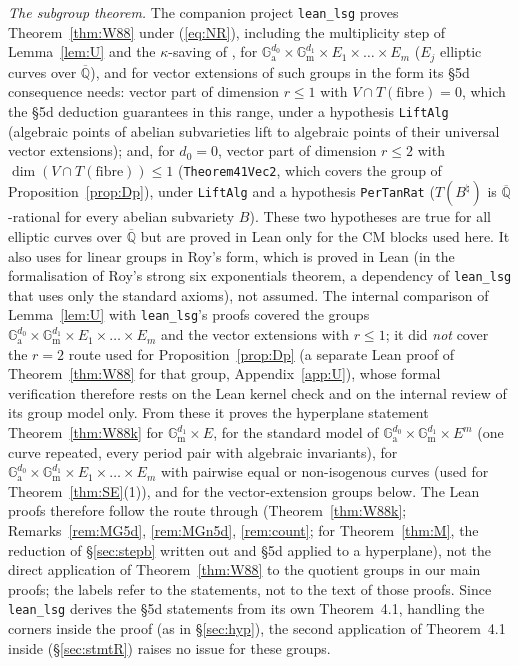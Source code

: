 \documentclass[11pt]{amsart}
\theoremstyle{definition}
\newcommand{\Qb}{\overline{\mathbb{Q}}}
\newcommand{\Ga}{\mathbb{G}_{\mathrm a}}
\newcommand{\Gm}{\mathbb{G}_{\mathrm m}}
\begin{document}
\emph{The subgroup theorem.} The companion project \texttt{lean\_lsg} \cite{LSG} proves Theorem~\ref{thm:W88} under (\ref{eq:NR}),
including the multiplicity step of Lemma~\ref{lem:U} and the $\kappa$-saving of \cite[Prop.~2.1]{W83}, for
$\Ga^{d_0}\times\Gm^{d_1}\times E_1\times\dots\times E_m$ ($E_j$ elliptic curves over $\Qb$), and for vector extensions of
such groups in the form its \S5d consequence needs: vector part of dimension $r\le1$ with $V\cap T(\text{fibre})=0$, which
the \S5d deduction guarantees in this range, under a hypothesis \texttt{LiftAlg} (algebraic points of abelian subvarieties
lift to algebraic points of their universal vector extensions); and, for $d_0=0$, vector part of dimension $r\le2$ with
$\dim(V\cap T(\text{fibre}))\le1$ (\texttt{Theorem41Vec2}, which covers the group of Proposition~\ref{prop:Dp}), under
\texttt{LiftAlg} and a hypothesis \texttt{PerTanRat} ($T(B^\natural)$ is $\Qb$-rational for every abelian subvariety $B$).
These two hypotheses are true for all elliptic curves over $\Qb$ but are proved in Lean only for the CM blocks used here.
It also uses \cite[Thm.~4.1]{W88} for linear groups in Roy's form, which is proved in Lean (in the formalisation of Roy's
strong six exponentials theorem, a dependency of \texttt{lean\_lsg} that uses only the standard axioms), not assumed. The internal comparison of Lemma~\ref{lem:U}
with \texttt{lean\_lsg}'s proofs covered the groups $\Ga^{d_0}\times\Gm^{d_1}\times E_1\times\dots\times E_m$ and the vector
extensions with $r\le1$; it did \emph{not} cover the $r=2$ route used for Proposition~\ref{prop:Dp} (a separate Lean proof of
Theorem~\ref{thm:W88} for that group, Appendix~\ref{app:U}), whose formal verification therefore rests on the Lean
kernel check and on the internal review of its group model only. From these it proves the
hyperplane statement Theorem~\ref{thm:W88k} for $\Gm^{d_1}\times E$, for the standard model of $\Ga^{d_0}\times\Gm^{d_1}\times
E^m$ (one curve repeated, every period pair with algebraic invariants), for $\Ga^{d_0}\times\Gm^{d_1}\times E_1\times\dots\times
E_m$ with pairwise equal or non-isogenous curves (used for Theorem~\ref{thm:SE}(1)), and for the vector-extension groups
below. The Lean
proofs therefore follow the route through \cite[\S5d]{W88} (Theorem~\ref{thm:W88k}; Remarks~\ref{rem:MG5d},
\ref{rem:MGn5d}, \ref{rem:count}; for Theorem~\ref{thm:M}, the reduction of \S\ref{sec:stepb} written out and \S5d applied to a
hyperplane), not the direct application of Theorem~\ref{thm:W88} to the quotient groups in our main proofs; the labels
refer to the statements, not to the text of those proofs. Since \texttt{lean\_lsg} derives the \S5d statements from its own
Theorem~4.1, handling the corners inside the proof (as in \S\ref{sec:hyp}), the second application of Theorem~4.1 inside
\cite[\S5d]{W88} (\S\ref{sec:stmtR}) raises no issue for these groups.
\end{document}
